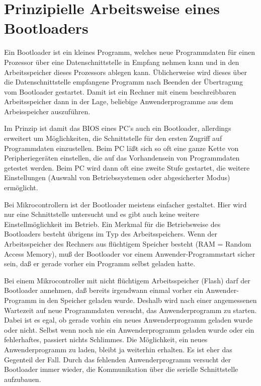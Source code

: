 \chapter{Prinzipielle Arbeitsweise eines Bootloaders}

Ein Bootloader ist ein kleines Programm, welches neue Programmdaten
für einen Prozessor über eine Datenschnittstelle in Empfang nehmen kann
und in den Arbeitsspeicher dieses Prozessors ablegen kann.
Üblicherweise wird dieses über die Datenschnittstelle empfangene
Programm nach Beenden der Übertragung vom Bootloader gestartet.
Damit ist ein Rechner mit einem beschreibbaren Arbeitsspeicher
dann in der Lage, beliebige Anwenderprogramme aus dem
Arbeisspeicher auszuführen.


Im Prinzip ist damit das BIOS eines PC's auch ein Bootloader,
allerdings erweitert um Möglichkeiten, die Schnittstelle
für den ersten Zugriff auf Programmdaten einzustellen.
Beim PC läßt sich so oft eine ganze Kette von Peripheriegeräten
einstellen, die auf das Vorhandensein von Programmdaten
getestet werden. 
Beim PC wird dann oft eine zweite Stufe gestartet, die weitere
Einstellungen (Auswahl von Betriebssystemen oder abgesicherter
Modus) ermöglicht.


Bei Mikrocontrollern ist der Bootloader meistens einfacher gestaltet.
Hier wird nur eine Schnittstelle untersucht und es gibt auch keine
weitere Einstellmöglichkeit im Betrieb.
Ein Merkmal für die Betriebsweise des Bootloaders besteht übrigens
im Typ des Arbeitsspeichers. Wenn der Arbeitsspeicher des Rechners
aus flüchtigem Speicher besteht (RAM = Random Access Memory), muß
der Bootloader vor einem Anwender-Programmstart sicher sein,
daß er gerade vorher ein Programm selbst geladen hatte.

Bei einem Mikrocontroller mit nicht flüchtigem Arbeitsspeicher (Flash)
darf der Bootloader annehmen, daß bereits irgendwann einmal
vorher ein Anwender-Programm in den Speicher geladen wurde.
Deshalb wird nach einer angemessenen Wartezeit auf neue Programmdaten
versucht, das Anwenderprogramm zu starten. Dabei ist es egal,
ob gerade vorhin ein neues Anwenderprogramm geladen wurde oder nicht.
Selbst wenn noch nie ein Anwenderprogramm geladen wurde oder ein
fehlerhaftes, passiert nichts Schlimmes. Die Möglichkeit, ein
neues Anwenderprogramm zu laden, bleibt ja weiterhin erhalten.
Es ist eher das Gegenteil der Fall. Durch das fehlenden Anwenderprogramm
versucht der Bootloader immer wieder, die Kommunikation über
die serielle Schnittstelle aufzubauen.

